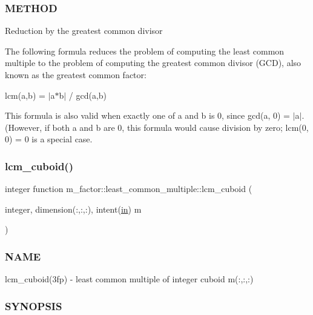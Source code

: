 \subsubsection*{M\+E\+T\+H\+OD}

Reduction by the greatest common divisor

The following formula reduces the problem of computing the least common multiple to the problem of computing the greatest common divisor (G\+CD), also known as the greatest common factor\+:

lcm(a,b) = $\vert$a$\ast$b$\vert$ / gcd(a,b)

This formula is also valid when exactly one of a and b is 0, since gcd(a, 0) = $\vert$a$\vert$. (However, if both a and b are 0, this formula would cause division by zero; lcm(0, 0) = 0 is a special case. \mbox{\label{interfacem__factor_1_1least__common__multiple_abfaed588cda0f7adc9a13933c05d4653}} 
\subsubsection{\texorpdfstring{lcm\+\_\+cuboid()}{lcm\_cuboid()}}
{\footnotesize\ttfamily integer function m\+\_\+factor\+::least\+\_\+common\+\_\+multiple\+::lcm\+\_\+cuboid (\begin{DoxyParamCaption}\item[{integer, dimension(\+:,\+:,\+:), intent(\hyperlink{M__journal_83_8txt_afce72651d1eed785a2132bee863b2f38}{in})}]{m }\end{DoxyParamCaption})\hspace{0.3cm}{\ttfamily [private]}}



\subsubsection*{N\+A\+ME}

lcm\+\_\+cuboid(3fp) -\/ least common multiple of integer cuboid m(\+:,\+:,\+:) \subsubsection*{S\+Y\+N\+O\+P\+S\+IS}

